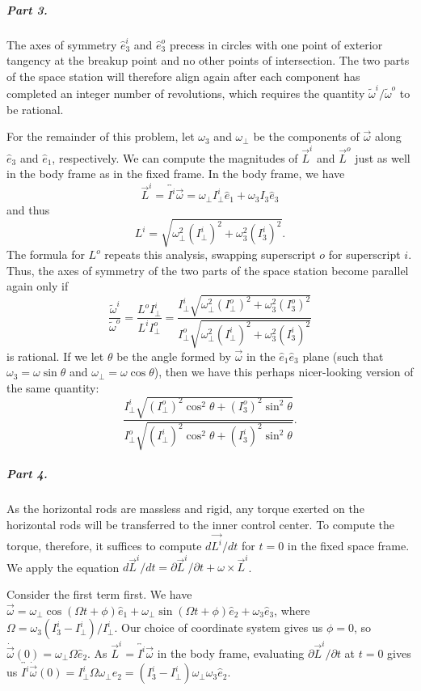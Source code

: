 \subparagraph{Part 3.}

The axes of symmetry $\hat{e}_3^i$ and $\hat{e}_3^o$ precess in circles with one point of exterior tangency at the breakup point and no other points of intersection.  The two parts of the space station will therefore align again after each component has completed an integer number of revolutions, which requires the quantity $\tilde{\omega}^i / \tilde{\omega}^o$ to be rational.

For the remainder of this problem, let $\omega_3$ and $\omega_\bot$ be the components of $\vec{\omega}$ along $\hat{e}_3$ and $\hat{e}_1$, respectively.  We can compute the magnitudes of $\vec{L}^i$ and $\vec{L}^o$ just as well in the body frame as in the fixed frame.  In the body frame, we have $$\vec{L}^i = \overleftrightarrow{I^i}\vec{\omega} = \omega_\bot I^i_\bot \hat{e}_1 + \omega_3 I_3 \hat{e}_3$$ and thus $$L^i = \sqrt{\omega_\bot^2 (I_\bot^i)^2 + \omega_3^2 (I_3^i)^2}.$$  The formula for $L^o$ repeats this analysis, swapping superscript $o$ for superscript $i$.  Thus, the axes of symmetry of the two parts of the space station become parallel again only if $$\frac{\tilde{\omega}^i}{\tilde{\omega}^o} = \frac{L^o I^i_\bot}{L^i I^o_\bot} = \frac{I^i_\bot \sqrt{\omega_\bot^2 (I_\bot^o)^2 + \omega_3^2 (I_3^o)^2}}{I^o_\bot \sqrt{\omega_\bot^2 (I_\bot^i)^2 + \omega_3^2 (I_3^i)^2}}$$ is rational.  If we let $\theta$ be the angle formed by $\vec{\omega}$ in the $\hat{e}_1 \hat{e}_3$ plane (such that $\omega_3 = \omega \sin \theta$ and $\omega_\bot = \omega \cos \theta$), then we have this perhaps nicer-looking version of the same quantity: $$\frac{I^i_\bot \sqrt{(I^o_\bot )^2 \cos^2 \theta + (I^o_3)^2 \sin^2 \theta}}{I^o_\bot \sqrt{(I^i_\bot)^2 \cos^2 \theta + (I^i_3)^2 \sin^2 \theta}}.$$

\subparagraph{Part 4.}  As the horizontal rods are massless and rigid, any torque exerted on the horizontal rods will be transferred to the inner control center.  To compute the torque, therefore, it suffices to compute $d\vec{L^i}/dt$ for $t = 0$ in the fixed space frame.  We apply the equation $d\vec{L}^i/dt = \partial \vec{L}^i/\partial t + \omega \times \vec{L}^i$.

Consider the first term first.  We have $\vec{\omega} = \omega_\bot \cos (\Omega t + \phi) \hat{e}_1 + \omega_\bot \sin (\Omega t + \phi) \hat{e}_2 + \omega_3 \hat{e}_3$, where $\Omega = \omega_3 (I^i_3 - I^i_\bot)/I^i_\bot$.  Our choice of coordinate system gives us $\phi = 0$, so $\dot{\vec{\omega}}(0) = \omega_\bot \Omega \hat{e}_2$.  As $\vec{L}^i = \overleftrightarrow{I^i} \vec{\omega}$ in the body frame, evaluating $\partial \vec{L}^i/\partial t$ at $t = 0$ gives us $\overleftrightarrow{I^i} \dot{\vec{\omega}}(0) = I^i_\bot \Omega \omega_\bot \hat{e}_2 = (I^i_3 - I^i_\bot) \omega_\bot \omega_3 \hat{e}_2$.

